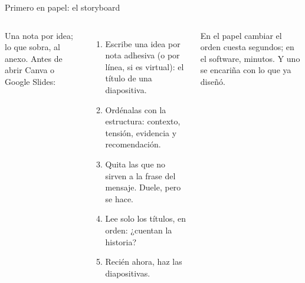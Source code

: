 \documentclass[aspectratio=169,11pt]{beamer}
\begin{document}
\begin{frame}[t]{Primero en papel: el storyboard}
  \begin{columns}[T,onlytextwidth]
    \centering

    {\scriptsize\color{black!60}Una nota por idea; lo que sobra, al anexo.}
    \small Antes de abrir Canva o Google Slides:
    \begin{enumerate}
      \footnotesize
      \item Escribe una idea por nota adhesiva (o por línea, si es
        virtual): el título de una diapositiva.
      \item Ordénalas con la estructura: contexto, tensión, evidencia y
        recomendación.
      \item Quita las que no sirven a la frase del mensaje. Duele, pero
        se hace.
      \item Lee solo los títulos, en orden: ¿cuentan la historia?
      \item Recién ahora, haz las diapositivas.
    \end{enumerate}
    \footnotesize En el papel cambiar el orden cuesta segundos; en el
    software, minutos. Y uno se encariña con lo que ya diseñó.
  \end{columns}
\end{frame}
\end{document}
